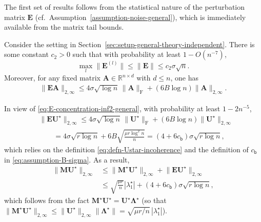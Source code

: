 The first set of results follows from the statistical nature of the
perturbation matrix $\bm{E}$ (cf.~Assumption~\ref{assumption-noise-general}),
which is immediately available from the matrix tail bounds. 
%
\begin{lemma}\label{lemma:general-noise-bound}
Consider the setting in Section~\ref{sec:setup-general-theory-independent}.
There is some constant $c_{2}>0$ such that with probability at least
$1-O(n^{-7})$,
\begin{equation}
\max_{l}\big\|\bm{E}^{(l)}\big\|\leq\|\bm{E}\|\leq c_{2}\sigma\sqrt{n}.\label{eq:noise-size-general}
\end{equation}
Moreover, for any fixed matrix $\bm{A}\in\mathbb{R}^{n\times d}$
with $d\leq n$, one has
\begin{align}
\|\bm{E}\bm{A}\|_{2,\infty}\leq4\sigma\sqrt{\log n}\,\|\bm{A}\|_{\mathrm{F}}+(6B\log n)\|\bm{A}\|_{2,\infty}.\label{eq:E-concentration-inf2-general}
\end{align}
 \end{lemma}

\begin{remark} In view of \eqref{eq:E-concentration-inf2-general},
with probability at least $1-2n^{-5}$,
\begin{align}
 & \|\bm{E}\bm{U}^{\star}\|_{2,\infty}\leq4\sigma\sqrt{\log n}\,\|\bm{U}^{\star}\|_{\mathrm{F}}+(6B\log n)\|\bm{U}^{\star}\|_{2,\infty}\nonumber \\
 & \qquad=4\sigma\sqrt{r\log n}+6B\sqrt{\frac{\mu r\log^{2}n}{n}}
 = (4+6c_{\mathsf{b}})\sigma\sqrt{r\log n},\label{eq:EU-2-inf-bound-general}
\end{align}
which relies on the definition \eqref{eq:defn-Ustar-incoherence}
and the definition of $c_{\mathsf{b}}$ in \eqref{eq:assumption-B-sigma}.
As a result,
\begin{align}
\big\|\bm{M}\bm{U}^{\star}\big\|_{2,\infty} & \leq\big\|\bm{M}^{\star}\bm{U}^{\star}\big\|_{2,\infty}+\big\|\bm{E}\bm{U}^{\star}\big\|_{2,\infty}\nonumber \\
&\leq \sqrt{\frac{\mu r}{n}}|\lambda_1^{\star}| + (4+6c_{\mathsf{b}})\sigma\sqrt{r\log n}, \label{eq:MU-2-inf-bound-general}
\end{align}
which follows from the fact $\bm{M}^{\star}\bm{U}^{\star}=\bm{U}^{\star}\bm{\Lambda}^{\star}$
(so that $\|\bm{M}^{\star}\bm{U}^{\star}\|_{2,\infty}\leq\big\|\bm{U}^{\star}\big\|_{2,\infty}\|\bm{\Lambda}^{\star}\|=\sqrt{\mu r/n}\,|\lambda_{1}^{\star}|$).
\end{remark}

